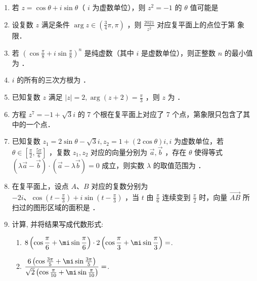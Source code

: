 \begin{enumerate}
\item 若 $z=\cos \theta+i \sin \theta$（ $i$ 为虚数单位），则 $z^2=-1$ 的 $\theta$ 值可能是

\item 设复数 $z$ 满足条件 $\arg z \in\left(\frac{3}{4} \pi, \pi\right)$ ，则 $\frac{2021}{\overline{z^2}}$ 对应复平面上的点位于第 象限．

\item 若 $\left(\cos \frac{\pi}{8}+i \sin \frac{\pi}{8}\right)^n$ 是纯虚数（其中 $i$ 是虚数单位），则正整数 $n$ 的最小值为 ．

\item $i$ 的所有的三次方根为  ．

\item 已知复数 $z$ 满足 $|z|=2, \arg (z+2)=\frac{\pi}{3}$ ，则 $z$ 为  ．

\item 方程 $z^7=-1+\sqrt{3} i$ 的 7 个根在复平面上对应了 7 个点，第象限只包含了其中的一个点．



\item 已知复数 $z_1=2 \sin \theta-\sqrt{3} i, z_2=1+(2 \cos \theta) i, i$ 为虚数单位，若 $\theta \in\left[\frac{\pi}{2}, \frac{5 \pi}{6}\right]$ ，复数 $z_1, z_2$ 对应的向量分别为 $\vec{a}, \vec{b}$ ，存在 $\theta$ 使得等式 $(\lambda \vec{a}-\vec{b}) \cdot(\vec{a}-\lambda \vec{b})=0$ 成立，则实数 $\lambda$ 的取值范围为 ．

\item 在复平面上，设点 $A 、 B$ 对应的复数分别为 $-2 i 、 \cos \left(t-\frac{\pi}{3}\right)+i \sin \left(t-\frac{\pi}{3}\right)$ ，当 $t$ 由 $\frac{\pi}{6}$ 连续变到 $\frac{\pi}{2}$ 时，向量 $\overrightarrow{A B}$ 所扫过的图形区域的面积是 ．



\item 计算, 并将结果写成代数形式: 
\begin{enumerate}[(1)]
\item $8\left(\cos\dfrac{\pi}{6}+\mi\sin\dfrac{\pi}{6}\right)\cdot2\left(\cos\dfrac{\pi}{3}+\mi\sin\dfrac{\pi}{3}\right)=$\blkda{$16\mi$}.  

\item $\dfrac{6\left(\cos\frac{3\pi}{5}+\mi\sin\frac{3\pi}{5}\right)}{\sqrt{2}\left(\cos\frac{\pi}{10}+\mi\sin\frac{\pi}{10}\right)}=$. 


\end{enumerate}
\end{enumerate}
